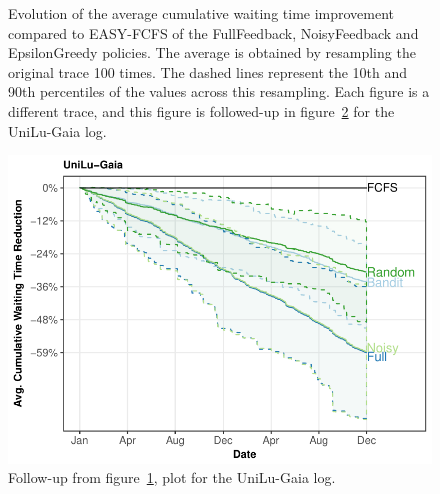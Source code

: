 \documentclass[sigconf,review]{acmart}
\begin{document}
\begin{figure}[h]
  \caption{Evolution of the average cumulative waiting time improvement
    compared to EASY-FCFS of the FullFeedback, NoisyFeedback and EpsilonGreedy
    policies. The average is obtained by resampling the original trace 100
    times. The dashed lines represent the 10th and 90th percentiles of the
  values across this resampling. Each figure is a different trace, and this
figure is followed-up in figure~\ref{fig:follow} for the UniLu-Gaia log.}

  \label{fig:small}
\end{figure}

\begin{figure}[ht]
  \centering
  \includegraphics[scale=0.6]{figures/UniLu-Ga.pdf}

  \caption{Follow-up from figure~\ref{fig:small}, plot for the UniLu-Gaia log.}

  \label{fig:follow}
\end{figure}
\end{document}
